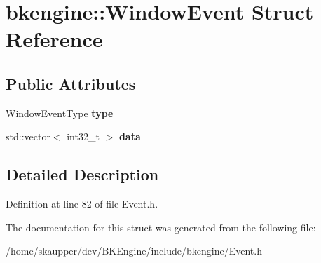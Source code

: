 \hypertarget{structbkengine_1_1WindowEvent}{}\section{bkengine\+:\+:Window\+Event Struct Reference}
\label{structbkengine_1_1WindowEvent}
\subsection*{Public Attributes}
\begin{DoxyCompactItemize}
\item 
\mbox{\label{structbkengine_1_1WindowEvent_ad03317d9c4222438ba3e9321fa0f2f9a}} 
Window\+Event\+Type {\bfseries type}
\item 
\mbox{\label{structbkengine_1_1WindowEvent_a1dc5d858cd7ecd44bed9810e41544b85}} 
std\+::vector$<$ int32\+\_\+t $>$ {\bfseries data}
\end{DoxyCompactItemize}


\subsection{Detailed Description}


Definition at line 82 of file Event.\+h.



The documentation for this struct was generated from the following file\+:\begin{DoxyCompactItemize}
\item 
/home/skaupper/dev/\+B\+K\+Engine/include/bkengine/Event.\+h\end{DoxyCompactItemize}
